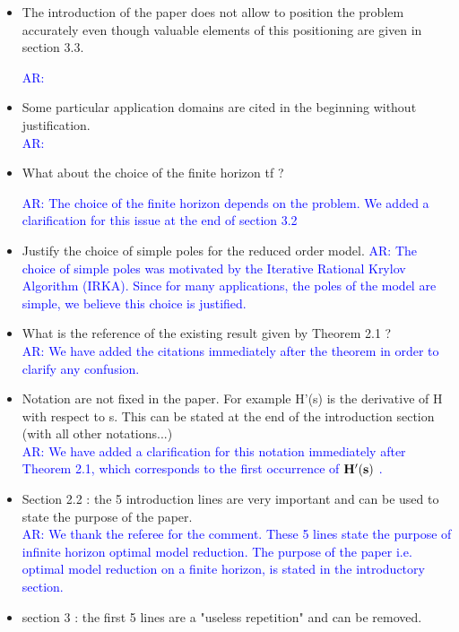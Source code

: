 \documentclass[11pt]{article}
\def\serkan#1{\textcolor{blue}{{#1}}}
\begin{document}
\begin{itemize}
\item The introduction of the paper does not allow to position the problem
accurately even though valuable elements of this positioning are given
in section 3.3. 

\serkan{\textsf{AR}:   }  

\item Some particular application domains are cited in the beginning without
justification. \\
\serkan{\textsf{AR}:   }  
\item What about the choice of the finite horizon tf ?

\serkan{\textsf{AR}: The choice of the finite horizon depends on the problem. We added a clarification for this issue at the end of section 3.2}

\item Justify the choice of simple poles for the reduced order model. 
\serkan{\textsf{AR}:  The choice of simple poles was motivated by the Iterative Rational Krylov Algorithm (IRKA). Since for many applications, the poles of the model are simple, we believe this choice is justified. }  

\item What is the reference of the existing result given by Theorem 2.1 ? \\
\serkan{\textsf{AR}:  We have added the citations immediately after the theorem in order to clarify any confusion. }  

\item Notation are not fixed in the paper. For example H'(s) is the
derivative of H with respect to s. This can be stated at the end of the
introduction section (with all other notations...)\\
\serkan{\textsf{AR}:  We have added a clarification for this notation immediately after Theorem 2.1, which corresponds to the first occurrence of $\bf{H}'(s)$ .} 

\item  Section 2.2 : the 5 introduction lines are very important and can be
used to state the purpose of the paper.  \\
\serkan{\textsf{AR}: We thank the referee for the comment. These 5 lines state the purpose of infinite horizon optimal model reduction. The purpose of the paper i.e. optimal model reduction on a finite horizon,  is stated in the introductory section.}

\item section 3 : the first 5 lines are a "useless repetition" and can be
removed. 


\end{itemize}
\end{document}
